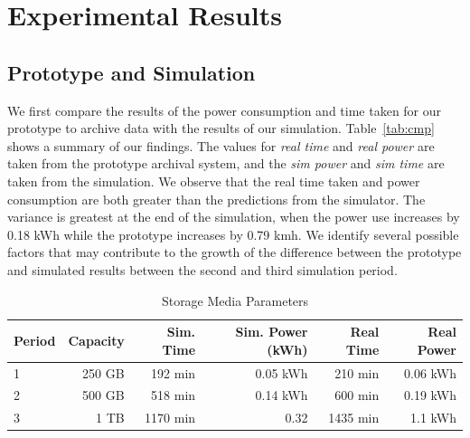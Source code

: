 \section{Experimental Results}

\subsection{Prototype and Simulation}
We first compare the results of the power consumption and time taken for our prototype to archive data with the results of our simulation.  Table~\ref{tab:cmp} shows a summary of our findings.  The values for \textit{real time} and \textit{real power} are taken from the prototype archival system, and the \textit{sim power} and \textit{sim time} are taken from the simulation.  We observe that the real time taken and power consumption are both greater than the predictions from the simulator.  The variance is greatest at the end of the simulation, when the power use increases by 0.18 kWh while the prototype increases by 0.79 kmh.  We identify several possible factors that may contribute to the growth of the difference between the prototype and simulated results between the second and third simulation period.

\begin{table}[!hbt]
\begin{minipage}{\linewidth}
\centering
  \caption{Storage Media Parameters}
  \label{tab:comp}
  \begin{tabular}{lr|rr|rr}
    \toprule
    \textbf{Period}&\textbf{Capacity}&\textbf{Sim. Time}&\textbf{Sim. Power (kWh)}&\textbf{Real Time}&\textbf{Real Power}\\
    \midrule
    1&250 GB&192 min&0.05 kWh&210 min&0.06 kWh\\
    2&500 GB&518 min&0.14 kWh&600 min&0.19 kWh\\
    3&1 TB&1170 min&0.32&1435 min&1.1 kWh\\
  \bottomrule
\end{tabular}
\end{minipage}
\end{table}

